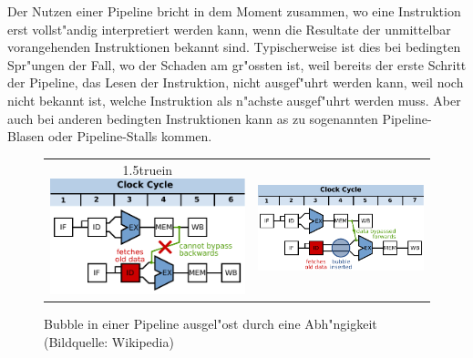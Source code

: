 Der Nutzen einer Pipeline bricht in dem Moment zusammen, wo eine Instruktion
erst vollst"andig interpretiert werden kann, wenn die Resultate
der unmittelbar vorangehenden Instruktionen bekannt sind.
Typischerweise ist dies bei bedingten Spr"ungen der Fall, wo der
Schaden am gr"ossten ist, weil bereits der erste Schritt der Pipeline,
das Lesen der Instruktion, nicht ausgef"uhrt werden kann, weil noch nicht
bekannt ist, welche Instruktion als n"achste ausgef"uhrt werden muss.
Aber auch bei anderen bedingten Instruktionen kann as zu sogenannten
Pipeline-Blasen oder Pipeline-Stalls kommen.
\begin{figure}
\begin{center}
\begin{tabular}{cc}
\begin{minipage}[b]{0.434\hsize}
\vsize1.5truein
\includegraphics[width=\hsize]{images/pipeline1.pdf}
\end{minipage}&
\begin{minipage}[b]{0.5\hsize}
\includegraphics[width=\hsize]{images/pipeline2.pdf}
\end{minipage}
\end{tabular}
\end{center}
\caption{Bubble in einer Pipeline ausgel"ost durch eine Abh"ngigkeit
(Bildquelle: Wikipedia)
\label{pipelinestall}}
\end{figure}

